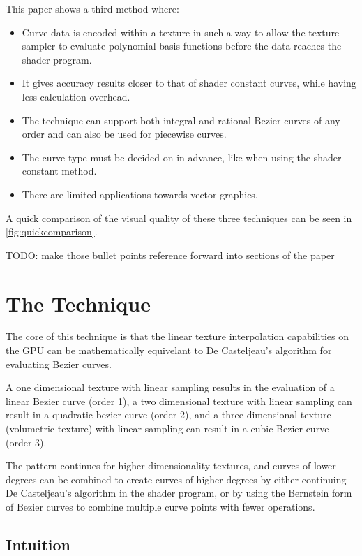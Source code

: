 \documentclass{jcgt}
\begin{document}
This paper shows a third method where:
\begin{itemize}
  \item Curve data is encoded within a texture in such a way to allow the texture sampler to evaluate polynomial basis functions before the data reaches the shader program.
  \item It gives accuracy results closer to that of shader constant curves, while having less calculation overhead.
  \item The technique can support both integral and rational Bezier curves of any order and can also be used for piecewise curves.
  \item The curve type must be decided on in advance, like when using the shader constant method.
  \item There are limited applications towards vector graphics.
\end{itemize}

A quick comparison of the visual quality of these three techniques can be seen in \autoref{fig:quickcomparison}.

TODO: make those bullet points reference forward into sections of the paper

\section{The Technique}
\label{sec:thetechnique}

The core of this technique is that the linear texture interpolation capabilities on the GPU can be mathematically equivelant to De Casteljeau's algorithm for evaluating Bezier curves.

A one dimensional texture with linear sampling results in the evaluation of a linear Bezier curve (order 1), a two dimensional texture with linear sampling can result in a quadratic bezier curve (order 2), and a three dimensional texture (volumetric texture) with linear sampling can result in a cubic Bezier curve (order 3).

The pattern continues for higher dimensionality textures, and curves of lower degrees can be combined to create curves of higher degrees by either continuing De Casteljeau's algorithm in the shader program, or by using the Bernstein form of Bezier curves to combine multiple curve points with fewer operations.

\subsection{Intuition}
\end{document}

